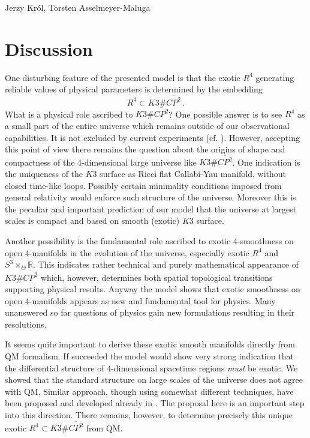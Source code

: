 \begin{artengenv2auth}{Jerzy Kr\'ol, Torsten Asselmeyer-Maluga}
\section{Discussion}
One disturbing feature of the presented model is that the exotic $R^4$ generating reliable values of physical parameters is determined by the embedding 
\[R^4\subset K3\# \overline{CP^2}\,. \] What is a physical role ascribed to $K3\# \overline{CP^2}$? One possible answer is to see $R^4$ as a small part of the entire universe which remains outside of our observational capabilities. It is not excluded by current experiments (cf. \cite{AK2018}). However, accepting this point of view there remains the question about the origins of shape and compactness of the 4-dimensional large universe like $K3\# \overline{CP^2}$. One indication is the uniqueness of the $K3$ surface as Ricci flat Callabi-Yau manifold, without closed time-like loops. Possibly certain minimality conditions imposed from general relativity would enforce such structure of the universe. Moreover this is the peculiar and important prediction of our model that the universe at largest scales is compact and based on smooth (exotic) $K3$ surface.

Another possibility is the fundamental role ascribed to exotic 4-smoothness on open 4-manifolds in the evolution of the universe, especially exotic $R^4$ and $S^3\times_{\Theta} \mathbb{R}$. This indicates rather technical and purely mathematical appearance of $K3\# \overline{CP^2}$ which, however, determines both spatial topological transitions supporting physical results. Anyway the model shows that exotic smoothness on open 4-manifolds appears as new and fundamental tool for physics. Many unanswered so far questions of physics gain new formulations resulting in their resolutions. 

It seems quite important to derive these exotic smooth manifolds directly from QM formalism. If succeeded the model would show very strong indication that the differential structure of 4-dimensional spacetime regions \emph{must} be exotic. We showed that the standard structure on large scales of the universe does not agree with QM. Similar approach, though using somewhat different techniques, have been proposed and developed already in \parencite{JKuniverse17,JK2017a}. 
The proposal here is an important step into this direction. There remains, however, to determine precisely this unique exotic $R^4\subset K3\# \overline{CP^2}$ from QM. 



\end{artengenv2auth}

